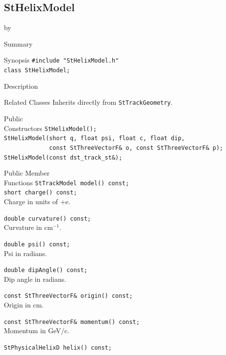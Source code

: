 \documentclass[twoside]{article}
\newcommand{\entrylabel}[1]{\mbox{\textbf{{#1}}}\hfil}%
\newenvironment{entry}
{\begin{list}{}%
    {\renewcommand{\makelabel}{\entrylabel}%
     \setlength{\labelwidth}{90pt}%
     \setlength{\leftmargin}{\labelwidth}
     \advance\leftmargin by \labelsep%
      }%
    }%
  {\end{list}}
\newcommand{\Entrylabel}[1]%
{\raisebox{0pt}[1ex][0pt]{\makebox[\labelwidth][l]%
    {\parbox[t]{\labelwidth}{\hspace{0pt}\textbf{{#1}}}}}}
\newenvironment{Entry}%
{\renewcommand{\entrylabel}{\Entrylabel}\begin{entry}}%
  {\end{entry}}
\begin{document}
\subsection{StHelixModel}
\label{sec:StHelixModel}
\begin{Entry}
\item[Summary]
\item[Synopsis]
    \verb+#include "StHelixModel.h"+\\
    \verb+class StHelixModel;+\\
\item[Description]
\item[Related Classes]
    Inherits directly from \texttt{StTrackGeometry}.
    
\item[Public\\ Constructors]
    \verb+StHelixModel();+\\
    
    \verb+StHelixModel(short q, float psi, float c, float dip,+\\
    \verb+             const StThreeVectorF& o, const StThreeVectorF& p);+\\
    
    \verb+StHelixModel(const dst_track_st&);+\\
    
\item[Public Member\\ Functions]
    \verb+StTrackModel model() const;+\\

    \verb+short charge() const;+\\
    Charge in units of +e.
    
    \verb+double curvature() const;+\\
    Curvature in cm$^{-1}$.

    \verb+double psi() const;+\\
    Psi in radians.
    
    \verb+double dipAngle() const;+\\
    Dip angle in radians.
    
    \verb+const StThreeVectorF& origin() const;+\\
    Origin in cm.
    
    \verb+const StThreeVectorF& momentum() const;+\\
    Momentum in GeV/c.
    
    \verb+StPhysicalHelixD helix() const;+\\
\end{Entry}
\clearpage
\end{document}
